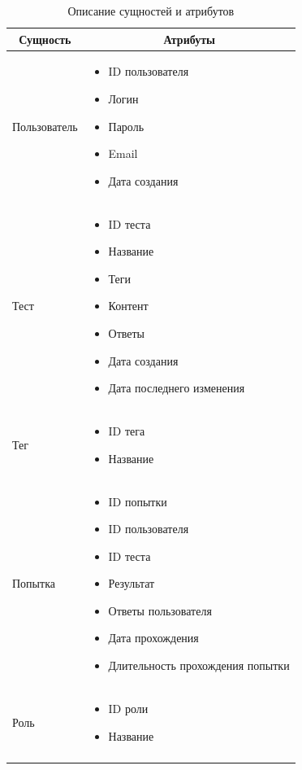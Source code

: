 \begin{longtable}[c]{|l|p{6.5cm}|}
    \hline
    \multicolumn{1}{|c|}{\textbf{Сущность}} & \multicolumn{1}{c|}{\textbf{Атрибуты}}
    \\ \hline
    Пользователь & \begin{itemize}
        \item ID пользователя
        \item Логин
        \item Пароль
        \item Email
        \item Дата создания
    \end{itemize} \\ \hline
    Тест & \begin{itemize}
        \item ID теста
        \item Название
        \item Теги
        \item Контент
        \item Ответы
        \item Дата создания
        \item Дата последнего изменения
    \end{itemize} \\ \hline
    Тег & \begin{itemize}
        \item ID тега
        \item Название
    \end{itemize}
    \\ \hline
    Попытка & \begin{itemize}
        \item ID попытки
        \item ID пользователя
        \item ID теста
        \item Результат
        \item Ответы пользователя
        \item Дата прохождения
        \item Длительность прохождения попытки
    \end{itemize}
    \\ \hline
    Роль & \begin{itemize}
        \item ID роли
        \item Название
    \end{itemize}
    \\ \hline
    \caption{Описание сущностей и атрибутов}
\end{longtable}

